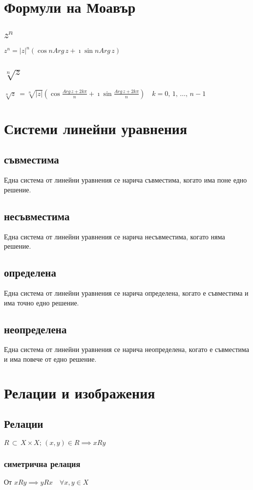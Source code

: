 \documentclass{article}
\begin{document}
    \section{Формули на Моавър}
    \subsection{\(z^n\)}
    \(z^n = |z|^n(\cos{nArg\,z} + \imath\sin{nArg\,z})\)
    \subsection{\(\sqrt[n]z\)}
    \(\sqrt[n]z\ = \sqrt[n]{|z|}(\cos{\frac{Arg\,z + 2k\pi}{n}} + \imath\sin{\frac{Arg\,z + 2k\pi}{n}}) \quad k = 0, \, 1, \, \dots, \, n - 1\)
    \section{Системи линейни уравнения}
    \subsection{съвместима}
    Една система от линейни уравнения се нарича съвместима, когато има поне едно решение.
    \subsection{несъвместима}
    Една система от линейни уравнения се нарича несъвместима, когато няма решение.
    \subsection{определена}
    Една система от линейни уравнения се нарича определена, когато е съвместима и има точно едно решение.
    \subsection{неопределена}
    Една система от линейни уравнения се нарича неопределена, когато е съвместима и има повече от едно решение.
    \section{Релации и изображения}
    \subsection{Релации}
    \(R \, \subset \, X \times X; \, (x, y) \in R \implies xRy\)
    \subsubsection{симетрична релация}
    От \(xRy \implies yRx \quad \forall x, y \in X\)
\end{document}
